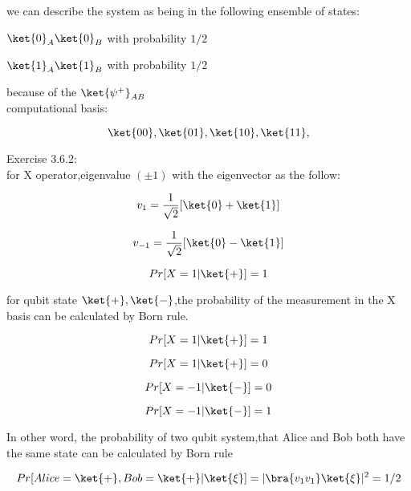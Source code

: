 \documentclass[xelatex,ja=standard,jafont=noto]{bxjsarticle}
\begin{document}
we can describe the system as being in the following
ensemble of states:


    $\ket{0}_{A}\ket{0}_{B}$ with probability $1/2$
    
    $\ket{1}_{A}\ket{1}_{B}$ with probability $1/2$
    
    
because of the $\ket{\psi^{+}}_{AB}$\\

computational basis:

\begin{equation}
    \ket{00},\ket{01},\ket{10},\ket{11},
\end{equation}


Exercise 3.6.2:\\


for X operator,eigenvalue $(\pm1)$ with the eigenvector as the follow:

\begin{equation}
    v_{1}=\frac{1}{\sqrt{2}}[\ket{0}+\ket{1}]
\end{equation}

\begin{equation}
    v_{-1}=\frac{1}{\sqrt{2}}[\ket{0}-\ket{1}]
\end{equation}

\begin{equation}
    Pr[X=1|\ket{+}]=1
\end{equation}


for qubit state $\ket{+},\ket{-}$,the probability of the measurement in the X basis can be calculated by Born rule.

\begin{equation}
    Pr[X=1|\ket{+}]=1
\end{equation}

\begin{equation}
    Pr[X=1|\ket{+}]=0
\end{equation}

\begin{equation}
    Pr[X=-1|\ket{-}]=0
\end{equation}

\begin{equation}
    Pr[X=-1|\ket{-}]=1
\end{equation}


In other word, the probability of two qubit system,that Alice and Bob both have the same state can be calculated by Born rule

\begin{equation}
    Pr[Alice=\ket{+},Bob=\ket{+}|\ket{\xi}]=|\bra{v_{1}v_{1}}\ket{\xi}|^{2}=1/2
\end{equation}
\end{document}
